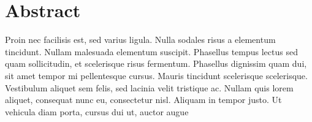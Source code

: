 \chapter*{Abstract}\label{abstract}
Proin nec facilisis est, sed varius ligula. Nulla sodales risus a elementum tincidunt. Nullam malesuada elementum suscipit. Phasellus tempus lectus sed quam sollicitudin, et scelerisque risus fermentum. Phasellus dignissim quam dui, sit amet tempor mi pellentesque cursus. Mauris tincidunt scelerisque scelerisque. Vestibulum aliquet sem felis, sed lacinia velit tristique ac. Nullam quis lorem aliquet, consequat nunc eu, consectetur nisl. Aliquam in tempor justo. Ut vehicula diam porta, cursus dui ut, auctor augue